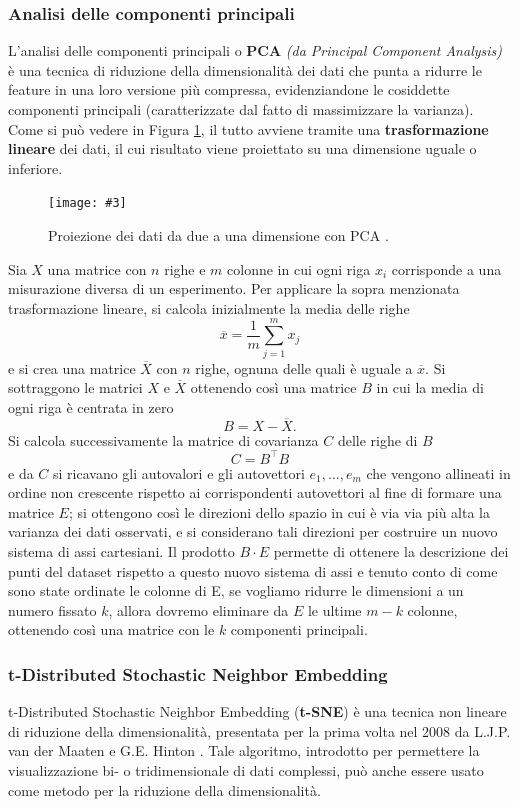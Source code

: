 \documentclass[12pt, twoside, letterpaper]{report}
\newcommand{\img}[4] {
	\begin{figure}
		\centering
		\texttt{[image: \#3]}\\
		\caption{#1}
		\label{fig:#4}
	\end{figure}
}
\begin{document}
				\subsubsection{Analisi delle componenti principali} L'analisi delle componenti principali o \textbf{PCA} \textit{(da Principal Component Analysis)} è una tecnica di riduzione della dimensionalità dei dati che punta a ridurre le feature in una loro versione più compressa, evidenziandone le cosiddette componenti principali (caratterizzate dal fatto di massimizzare la varianza). Come si può vedere in Figura \ref{fig:pca}, il tutto avviene tramite una \textbf{trasformazione lineare} dei dati, il cui risultato viene proiettato su una dimensione uguale o inferiore.
				\img{Proiezione dei dati da due a una dimensione con PCA \cite{bitsofdna}.}{0.3}{pca.jpg}{pca}
				Sia $X$ una matrice con $n$ righe e $m$ colonne in cui ogni riga $x_i$ corrisponde a una misurazione diversa di un esperimento.  Per applicare la sopra menzionata trasformazione lineare, si calcola inizialmente la media delle righe 
				$$\overline{x}= \frac{1}{m} \sum_{j=1}^m x_j$$ 
				e si crea una matrice $\overline{X}$ con $n$ righe, ognuna delle quali è uguale a $\overline{x}$. Si sottraggono le matrici $X$ e $\overline{X}$ ottenendo così una matrice $B$ in cui la media di ogni riga è centrata in zero
				$$B = X - \overline{X}.$$
					 Si calcola successivamente la matrice di covarianza $C$ delle righe di $B$
					 $$C = B^\top B$$
					 e da $C$ si ricavano gli autovalori e gli autovettori $e_1, \dots, e_m$ che vengono allineati in ordine non crescente rispetto ai corrispondenti autovettori al fine di formare una matrice $E$; si ottengono così le direzioni dello spazio in cui è via via più alta la varianza dei dati osservati, e si considerano tali direzioni per costruire un nuovo sistema di assi cartesiani. Il prodotto $B \cdot E$ permette di ottenere la descrizione dei punti del dataset rispetto a questo nuovo sistema di assi e tenuto conto di come sono state ordinate le colonne di E, se vogliamo ridurre le dimensioni a un numero fissato $k$, allora dovremo eliminare da $E$ le ultime $m-k$ colonne, ottenendo così una matrice con le $k$ componenti principali.  	 
				
				\subsubsection{t-Distributed Stochastic Neighbor Embedding} t-Distributed Stochastic Neighbor Embedding (\textbf{t-SNE}) è una tecnica non lineare di riduzione della dimensionalità, presentata per la prima volta nel 2008 da  L.J.P. van der Maaten e G.E. Hinton \cite{maaten_hinton}. Tale algoritmo, introdotto per permettere la visualizzazione bi- o tridimensionale di dati complessi, può anche essere usato come metodo per la riduzione della dimensionalità.
				
\end{document}
